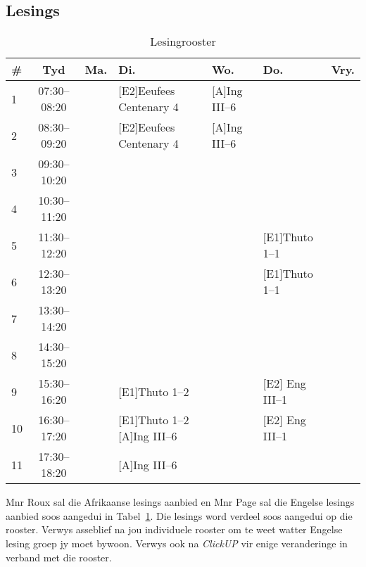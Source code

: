     \subsection{Lesings}
        \begin{table}[!h]
            \begin{center}
             \begin{tabular}{|l|c|p{1.4cm}|p{2.6cm}|p{2.1cm}|p{2.6cm}|p{1.4cm}|}
                 \hline
                 {\bf \#} & {\bf Tyd} & {\bf Ma.} & {\bf Di.} & {\bf Wo.} &
                 {\bf Do.} & {\bf Vry.} \\
                 \hline
                 1  & 07:30--08:20 &  & [E2]Eeufees Centenary 4 & [A]Ing III--6 &  & \\ \hline
                 2  & 08:30--09:20 &  & [E2]Eeufees Centenary 4 & [A]Ing III--6 &  & \\ \hline
                 3  & 09:30--10:20 &  &  &  &  & \\ \hline
                 4  & 10:30--11:20 &  &  &  &  & \\ \hline
                 5  & 11:30--12:20 &  &  &  & [E1]Thuto 1--1 & \\ \hline
                 6  & 12:30--13:20 &  &  &  & [E1]Thuto 1--1 & \\ \hline
                 7  & 13:30--14:20 &  &  &  &  & \\ \hline
                 8  & 14:30--15:20 &  &  &  &  & \\ \hline
                 9  & 15:30--16:20 &  & [E1]Thuto 1--2 &  & [E2] Eng III--1 & \\ \hline
                 10 & 16:30--17:20 &  & [E1]Thuto 1--2 [A]Ing III--6 &  & [E2] Eng III--1 & \\ \hline
                 11 & 17:30--18:20 &  & [A]Ing III--6 &  &  & \\
                 \hline
             \end{tabular}
             \caption{Lesingrooster}
            \label{tab:lectures}
            \end{center}
        \end{table}

        Mnr Roux sal die Afrikaanse lesings aanbied en Mnr Page sal die Engelse
        lesings aanbied soos aangedui in Tabel~\ref{tab:lectures}. Die lesings
        word verdeel soos aangedui op die rooster. Verwys asseblief na jou
        individuele rooster om te weet watter Engelse lesing groep jy moet
        bywoon. Verwys ook na \textit{ClickUP} vir enige veranderinge in
        verband met die rooster.

